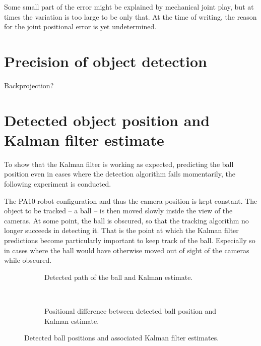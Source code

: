 Some small part of the error might be explained by mechanical joint play, but at times the variation is too large to be only that.
At the time of writing, the reason for the joint positional error is yet undetermined.



\section{Precision of object detection}
Backprojection?


\section{Detected object position and Kalman filter estimate}
To show that the Kalman filter is working as expected, predicting the ball position even in cases where the detection algorithm fails momentarily, the following experiment is conducted.

The PA10 robot configuration and thus the camera position is kept constant.
The object to be tracked -- a ball -- is then moved slowly inside the view of the cameras.
At some point, the ball is obscured, so that the tracking algorithm no longer succeeds in detecting it.
That is the point at which the Kalman filter predictions become particularly important to keep track of the ball.
Especially so in cases where the ball would have otherwise moved out of sight of the cameras while obscured.

\begin{figure}[htb]
    \centering
    \begin{subfigure}[b]{0.49\textwidth}
        \resizebox{\columnwidth}{!}{%
            
        }
        \caption{Detected path of the ball and Kalman estimate.}
        \label{fig:ball_kalman_3d}
    \end{subfigure}~
    \begin{subfigure}[b]{0.49\textwidth}
        \resizebox{\columnwidth}{!}{%
            
        }
        \caption{Positional difference between detected ball position and Kalman estimate.}
        \label{fig:ball_kalman_error}
    \end{subfigure}
    \caption{Detected ball positions and associated Kalman filter estimates.}
    \label{fig:kalman_test}
\end{figure}

